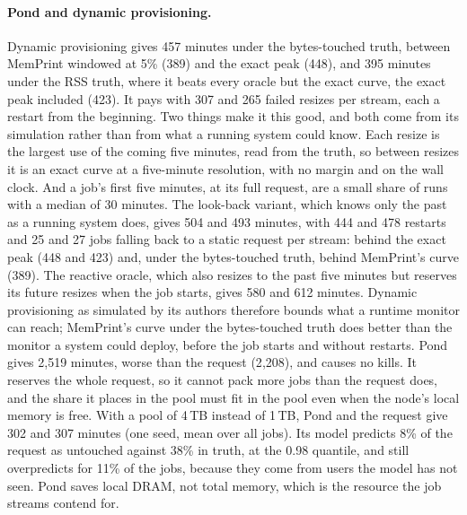 \documentclass[11pt]{article}
\newcommand{\memprint}{MemPrint}
\begin{document}
\paragraph{Pond and dynamic provisioning.} Dynamic provisioning gives 457 minutes under the bytes-touched truth,
between \memprint{} windowed at 5\% (389) and the exact peak (448), and 395 minutes under the RSS truth, where it
beats every oracle but the exact curve, the exact peak included (423). It pays with 307 and 265 failed resizes
per stream, each a restart from the beginning. Two things make it this good, and both come from its simulation
rather than from what a running system could know. Each resize is the largest use of the coming five minutes,
read from the truth, so between resizes it is an exact curve at a five-minute resolution, with no margin and on
the wall clock. And a job's first five minutes, at its full request, are a small share of runs with a median of
30 minutes. The look-back variant, which knows only the past as a running system does, gives 504 and 493 minutes, with 444 and
478 restarts and 25 and 27 jobs falling back to a static request per stream: behind the exact peak (448 and 423) and,
under the bytes-touched truth, behind \memprint{}'s curve (389). The reactive oracle, which also resizes to the past
five minutes but reserves its future resizes when the job starts, gives 580 and 612 minutes. Dynamic provisioning
as simulated by its authors therefore bounds what a runtime monitor can reach; \memprint{}'s curve under the
bytes-touched truth does better than the monitor a system could deploy, before the job starts and without
restarts.
Pond gives 2{,}519 minutes, worse than the request (2{,}208), and causes no kills. It reserves the whole request,
so it cannot pack more jobs than the request does, and the share it places in the pool must fit in the pool
even when the node's local memory is free. With a pool of 4\,TB instead of 1\,TB, Pond and the request give
302 and 307 minutes (one seed, mean over all jobs). Its model predicts 8\% of the request as untouched against 38\% in truth, at the 0.98
quantile, and still overpredicts for 11\% of the jobs, because they come from users the model has not seen.
Pond saves local DRAM, not total memory, which is the resource the job streams contend for.
\end{document}
